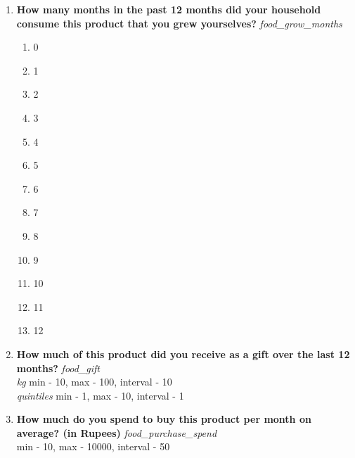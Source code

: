 \documentclass{article}
\begin{document}
\begin{enumerate}
\begin{enumerate}[label*=\arabic*.]
\item {\bfseries How many months in the past 12 months did your household consume this product that you grew yourselves?}\emph{ food\_grow\_months }
\begin{enumerate}
\item 0
\item 1
\item 2
\item 3
\item 4
\item 5
\item 6
\item 7
\item 8
\item 9
\item 10
\item 11
\item 12
\end{enumerate}
\item {\bfseries How much of this product did you receive as a gift over the last 12 months?}\emph{ food\_gift }
\\ \emph{ kg }min - 10, max - 100, interval - 10
\\ \emph{ quintiles }min - 1, max - 10, interval - 1

\item {\bfseries How much do you spend to buy this product per month on average? (in Rupees)}\emph{ food\_purchase\_spend }
\\min - 10, max - 10000, interval - 50


\end{enumerate}
\end{enumerate}
\end{document}
